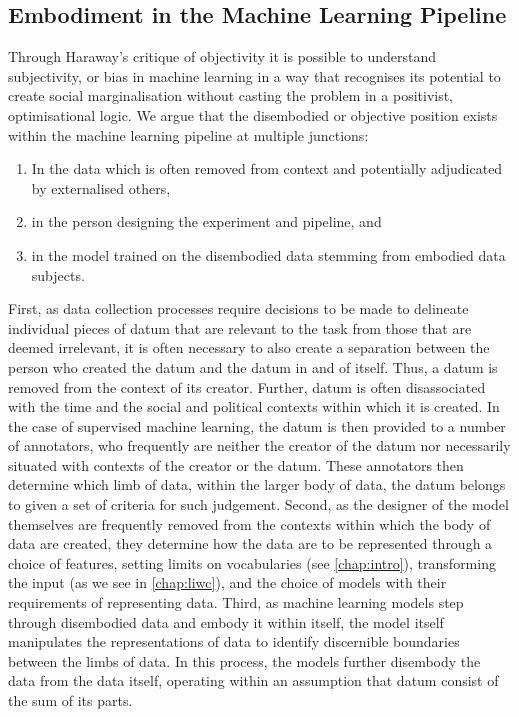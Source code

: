 \subsection{Embodiment in the Machine Learning Pipeline}
Through Haraway's \citet{Haraway:1988} critique of objectivity it is possible to understand subjectivity, or bias in machine learning in a way that recognises its potential to create social marginalisation without casting the problem in a positivist, optimisational logic. We argue that the disembodied or objective position exists within the machine learning pipeline at multiple junctions:
\begin{enumerate}
  \item{In the data which is often removed from context and potentially adjudicated by externalised others,}
  \item{in the person designing the experiment and pipeline, and}
  \item{in the model trained on the disembodied data stemming from embodied data subjects.}
\end{enumerate}
First, as data collection processes require decisions to be made to delineate individual pieces of datum that are relevant to the task from those that are deemed irrelevant, it is often necessary to also create a separation between the person who created the datum and the datum in and of itself. Thus, a datum is removed from the context of its creator. Further, datum is often disassociated with the time and the social and political contexts within which it is created. In the case of supervised machine learning, the datum is then provided to a number of annotators, who frequently are neither the creator of the datum nor necessarily situated with contexts of the creator or the datum. These annotators then determine which limb of data, within the larger body of data, the datum belongs to given a set of criteria for such judgement.
Second, as the designer of the model themselves are frequently removed from the contexts within which the body of data are created, they determine how the data are to be represented through a choice of features, setting limits on vocabularies (see \autoref{chap:intro}), transforming the input (as we see in \autoref{chap:liwc}), and the choice of models with their requirements of representing data.
Third, as machine learning models step through disembodied data and embody it within itself, the model itself manipulates the representations of data to identify discernible boundaries between the limbs of data. In this process, the models further disembody the data from the data itself, operating within an assumption that datum consist of the sum of its parts.

